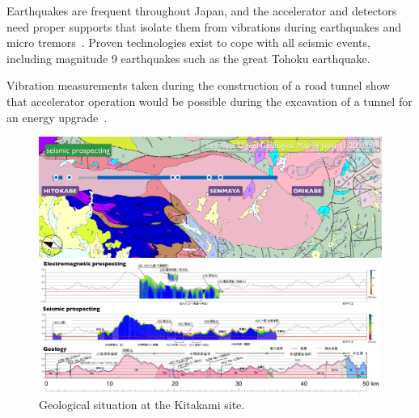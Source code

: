 Earthquakes are frequent throughout Japan, and the accelerator and detectors need  proper supports that isolate them from vibrations during earthquakes and micro tremors~\cite{Sanuki:2018b}. 
Proven technologies exist to cope with all seismic events, including magnitude 9 earthquakes such as the great Tohoku earthquake. 


Vibration measurements taken during the construction of a road tunnel show that accelerator operation would be possible during the excavation of a tunnel for an energy upgrade~\cite{Sanuki:2018a}.



\begin{figure}[htbp]
   \includegraphics[width=\hsize]{chapters/figures/Kitakami_Geology}
\caption{Geological situation at the Kitakami site.}
\label{fig:kitakami-geology}
\end{figure}



